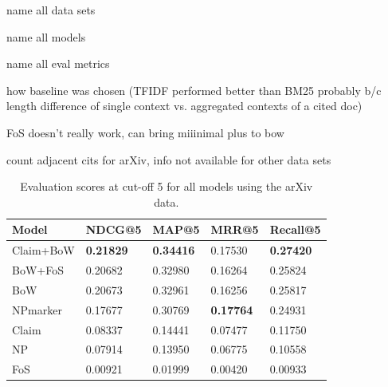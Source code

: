 name all data sets

name all models

name all eval metrics

how baseline was chosen (TFIDF performed better than BM25 probably b/c length difference of single context vs. aggregated contexts of a cited doc)

FoS doesn't really work, can bring miiinimal plus to bow

count adjacent cits for arXiv, info not available for other data sets




\begin{table}[]
\centering
    \caption{Evaluation scores at cut-off 5 for all models using the arXiv data.}
    \label{tab:arxivevalnumbers}
\begin{center}
    \begin{tabular}{lllll}
    \toprule
    Model & NDCG@5 & MAP@5 & MRR@5 & Recall@5 \\
    \midrule
    Claim+BoW & \textbf{0.21829} & \textbf{0.34416} & 0.17530 & \textbf{0.27420} \\
    BoW+FoS   & 0.20682 & 0.32980 & 0.16264 & 0.25824 \\
    BoW       & 0.20673 & 0.32961 & 0.16256 & 0.25817 \\
    NPmarker  & 0.17677 & 0.30769 & \textbf{0.17764} & 0.24931 \\
    Claim     & 0.08337 & 0.14441 & 0.07477 & 0.11750 \\
    NP        & 0.07914 & 0.13950 & 0.06775 & 0.10558 \\
    FoS       & 0.00921 & 0.01999 & 0.00420 & 0.00933 \\
    \bottomrule
    \end{tabular}
\end{center}
\end{table}

